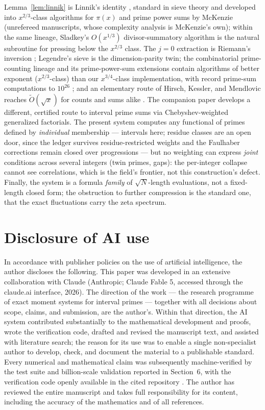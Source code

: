 \documentclass[11pt]{article}
\theoremstyle{remark}
\begin{document}
Lemma~\ref{lem:linnik} is Linnik's identity \cite{Linnik}, standard in sieve theory \cite{FI} and
developed into $x^{2/3}$-class algorithms for $\pi(x)$ and prime power sums by McKenzie
\cite{McKenzie} (unrefereed manuscripts, whose complexity analysis is McKenzie's own); within the same
lineage, Sladkey's $O(x^{1/3})$ divisor-summatory algorithm \cite{Sladkey} is the natural subroutine
for pressing below the $x^{2/3}$ class. The $j=0$ extraction is Riemann's inversion
\cite{Riemann,Edwards}; Legendre's sieve is the
dimension-parity twin; the combinatorial prime-counting lineage
\cite{DR,Staple} and its prime-power-sum extensions \cite{Orlov,Lucy,Walisch} contain algorithms of better
exponent ($x^{2/3}$-class) than our $x^{3/4}$-class implementation, with record prime-sum computations
to $10^{26}$ \cite{Walisch}; and an elementary route of Hirsch, Kessler, and Mendlovic reaches
$\widetilde{O}(\sqrt x)$ for counts and sums alike \cite{HKM}. The companion paper \cite{Companion} develops a
different, certified route to interval prime sums via Chebyshev-weighted generalized factorials. The
present system computes any functional of primes defined by \emph{individual} membership --- intervals
here; residue classes are an open door, since the ledger survives residue-restricted weights and the
Faulhaber corrections remain closed over progressions --- but no weighting can express \emph{joint}
conditions across several integers (twin primes, gaps): the per-integer collapse cannot see
correlations, which is the field's frontier, not this construction's defect. Finally, the system is a
formula \emph{family} of $\sqrt N$-length evaluations, not a fixed-length closed form; the obstruction
to further compression is the standard one, that the exact fluctuations carry the zeta spectrum.

\section*{Disclosure of AI use}

In accordance with publisher policies on the use of artificial intelligence, the author discloses the
following. This paper was developed in an extensive collaboration with Claude (Anthropic; Claude Fable
5, accessed through the claude.ai interface, 2026). The direction of the work --- the research
programme of exact moment systems for interval primes --- together
with all decisions about scope, claims, and submission, are the author's. Within that direction, the
AI system contributed substantially to the mathematical development and proofs, wrote the
verification code, drafted and revised the manuscript text, and assisted with literature search; the
reason for its use was to enable a single non-specialist author to develop, check, and document the
material to a publishable standard. Every numerical and mathematical claim was subsequently machine-verified by the
test suite and billion-scale validation reported in Section~6, with the verification code openly
available in the cited repository \cite{Code}. The author has reviewed the entire manuscript and takes
full responsibility for its content, including the accuracy of the mathematics and of all references.
\end{document}
